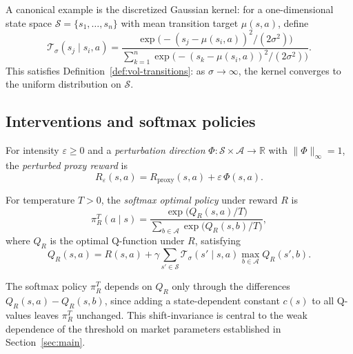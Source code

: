 A canonical example is the discretized Gaussian kernel: for a one-dimensional
state space $\mathcal{S} = \{s_1, \ldots, s_n\}$ with mean transition target
$\mu(s,a)$, define
\begin{equation}\label{eq:gaussian-kernel}
\mathcal{T}_\sigma(s_j \mid s_i, a) = \frac{\exp\bigl(-(s_j - \mu(s_i, a))^2
  / (2\sigma^2)\bigr)}{\sum_{k=1}^n \exp\bigl(-(s_k - \mu(s_i, a))^2 /
  (2\sigma^2)\bigr)}.
\end{equation}
This satisfies Definition~\ref{def:vol-transitions}: as $\sigma \to \infty$,
the kernel converges to the uniform distribution on $\mathcal{S}$.

\subsection{Interventions and softmax policies}

\begin{definition}\label{def:intervention}
For intensity $\varepsilon \geq 0$ and a \emph{perturbation direction}
$\Phi \colon \mathcal{S} \times \mathcal{A} \to \mathbb{R}$ with
$\lVert \Phi \rVert_\infty = 1$, the \emph{perturbed proxy reward} is
\[
R_\varepsilon(s,a) = R_{\mathrm{proxy}}(s,a) + \varepsilon \, \Phi(s,a).
\]
\end{definition}

\begin{definition}\label{def:softmax-policy}
For temperature $T > 0$, the \emph{softmax optimal policy} under reward $R$
is
\begin{equation}\label{eq:softmax}
\pi_R^T(a \mid s) = \frac{\exp\bigl(Q_R(s,a)/T\bigr)}{\sum_{b \in
  \mathcal{A}} \exp\bigl(Q_R(s,b)/T\bigr)},
\end{equation}
where $Q_R$ is the optimal Q-function under $R$, satisfying
\[
Q_R(s,a) = R(s,a) + \gamma \sum_{s' \in \mathcal{S}} \mathcal{T}_\sigma(s'
  \mid s, a) \max_{b \in \mathcal{A}} Q_R(s', b).
\]
\end{definition}

\begin{remark}\label{rem:softmax-invariance}
The softmax policy $\pi_R^T$ depends on $Q_R$ only through the differences
$Q_R(s,a) - Q_R(s,b)$, since adding a state-dependent constant $c(s)$ to all
Q-values leaves $\pi_R^T$ unchanged. This shift-invariance is central to the
weak dependence of the threshold on market parameters established in
Section~\ref{sec:main}.
\end{remark}


